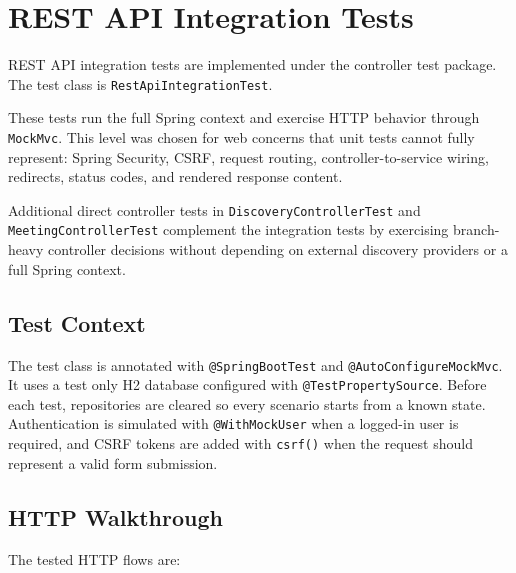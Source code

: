 \chapter{REST API Integration Tests} \label{cap:restapi}

REST API integration tests are implemented under the controller test package. The test class is \texttt{RestApiIntegrationTest}.

These tests run the full Spring context and exercise HTTP behavior through \texttt{MockMvc}. This level was chosen for web concerns that unit tests cannot fully represent: Spring Security, CSRF, request routing, controller-to-service wiring, redirects, status codes, and rendered response content.

Additional direct controller tests in \texttt{DiscoveryControllerTest} and \texttt{MeetingControllerTest} complement the integration tests by exercising branch-heavy controller decisions without depending on external discovery providers or a full Spring context.

\section{Test Context}

The test class is annotated with \texttt{@SpringBootTest} and \texttt{@AutoConfigureMockMvc}. It uses a test only H2 database configured with \texttt{@TestPropertySource}. Before each test, repositories are cleared so every scenario starts from a known state. Authentication is simulated with \texttt{@WithMockUser} when a logged-in user is required, and CSRF tokens are added with \texttt{csrf()} when the request should represent a valid form submission.

\section{HTTP Walkthrough}

The tested HTTP flows are:

